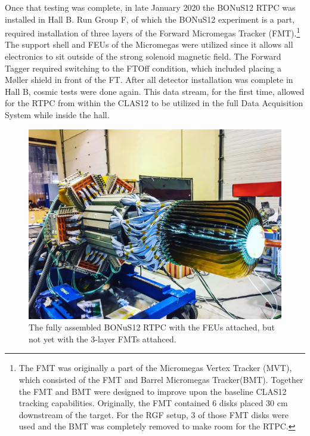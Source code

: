 Once that testing was complete, in late January 2020 the BONuS12 RTPC was installed in Hall B. Run Group F, of which the BONuS12 experiment is a part, required installation of three layers of the Forward Micromegas Tracker (FMT).\footnote{The FMT was originally a part of the Micromegas Vertex Tracker (MVT), which consisted of the FMT and Barrel Micromegas Tracker(BMT). Together the FMT and BMT were designed to improve upon the baseline CLAS12 tracking capabilities.\cite{clas12:MVT} Originally, the FMT contained 6 disks placed 30 cm downstream of the target. For the RGF setup, 3 of those FMT disks were used and the BMT was completely removed to make room for the RTPC.} The support shell and FEUs of the Micromegas were utilized since it allows all electronics to sit outside of the strong solenoid magnetic field.\cite{clas12:MVT} The Forward Tagger required switching to the FTOff condition, which included placing a M\o ller shield in front of the FT.\cite{clas12:FT} After all detector installation was complete in Hall B, cosmic tests were done again. This data stream, for the first time, allowed for the RTPC from within the CLAS12 to be utilized in the full Data Acquisition System \cite{clas12:data} while inside the hall.
\begin{figure}[h!]
	\centering
	\includegraphics[width=0.95\linewidth]{figures/rtpc_complete.png}
	\caption{The fully assembled BONuS12 RTPC with the FEUs attached, but not yet with the 3-layer FMTs attahced.}
	\label{fig:rtpc_complete}
\end{figure}

\cleardoublepage
